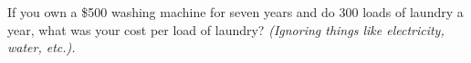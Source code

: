  \begin{problem}{4}
 \begin{description}
\item If you own a \$500 washing machine for seven years and do 300 loads of laundry a year, what was your cost per load of laundry? \emph{(Ignoring things like electricity, water, etc.). }
\end{description}
\end{problem}
\vspace{2in}

